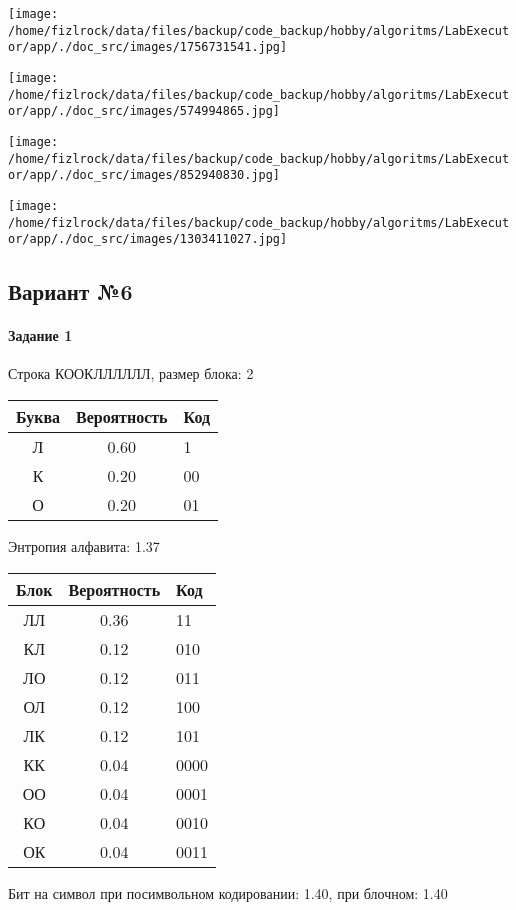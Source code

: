 \documentclass[a4paper, 12pt]{article}
\begin{document}
\texttt{[image: /home/fizlrock/data/files/backup/code\_backup/hobby/algoritms/LabExecutor/app/./doc\_src/images/1756731541.jpg]}

\texttt{[image: /home/fizlrock/data/files/backup/code\_backup/hobby/algoritms/LabExecutor/app/./doc\_src/images/574994865.jpg]}

\texttt{[image: /home/fizlrock/data/files/backup/code\_backup/hobby/algoritms/LabExecutor/app/./doc\_src/images/852940830.jpg]}

\texttt{[image: /home/fizlrock/data/files/backup/code\_backup/hobby/algoritms/LabExecutor/app/./doc\_src/images/1303411027.jpg]}
\pagebreak
\subsection{Вариант №6}
\paragraph{Задание 1}

Строка КООКЛЛЛЛЛЛ, размер блока: 2
\begin{center}
 \begin{tabular}{ |c|c|l| } 
  \hline
     Буква & Вероятность & Код\\ \hline
Л & 0.60 & 1\\\hline
К & 0.20 & 00\\\hline
О & 0.20 & 01
\\ \hline \end{tabular}
\end{center}
Энтропия алфавита: 1.37
\begin{center}
 \begin{tabular}{ |c|c|l| } 
  \hline
     Блок & Вероятность & Код\\ \hline
ЛЛ & 0.36 & 11\\\hline
КЛ & 0.12 & 010\\\hline
ЛО & 0.12 & 011\\\hline
ОЛ & 0.12 & 100\\\hline
ЛК & 0.12 & 101\\\hline
КК & 0.04 & 0000\\\hline
ОО & 0.04 & 0001\\\hline
КО & 0.04 & 0010\\\hline
ОК & 0.04 & 0011
\\ \hline \end{tabular}
\end{center}
Бит на символ при посимвольном кодировании: 1.40, при блочном: 1.40
\end{document}
